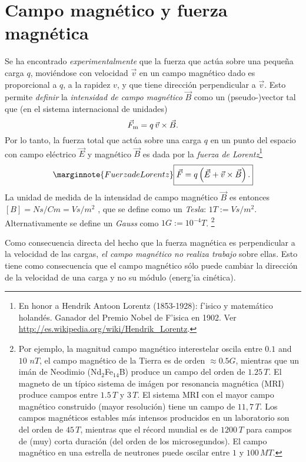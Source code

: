 \section{Campo magnético y fuerza magnética}
Se ha encontrado \textit{experimentalmente} que la fuerza que actúa sobre una peque\~na carga $q$, moviéndose con velocidad $\vec{v}$ en un campo magnético dado es proporcional a $q$, a la rapidez $v$, y que tiene dirección perpendicular a $\vec{v}$. Esto permite \textit{definir}  la \textit{intensidad de campo magnético} $\vec{B}$ como un (pseudo-)vector tal que (en el sistema internacional de unidades)
\begin{equation}
 \vec{F}_{\rm m}=q\,\vec{v}\times\vec{B}.
\end{equation}
Por lo tanto, la fuerza total que actúa sobre una carga $q$ en un punto del espacio con campo eléctrico $\vec{E}$ y magnético $\vec{B}$ es dada por la \textit{fuerza de Lorentz}\footnote{En honor a Hendrik Antoon Lorentz (1853-1928): f'isico y matemático holandés. Ganador del Premio Nobel de F'isica en 1902. Ver \url{http://es.wikipedia.org/wiki/Hendrik_Lorentz}.}
\begin{equation}\marginnote{Fuerza de Lorentz}
\boxed{ \vec{F}=q\left(\vec{E}+\vec{v}\times\vec{B}\right).}
\end{equation}
La unidad de medida de la intensidad de campo magnético $\vec{B}$ es entonces  $[B]=Ns/Cm=Vs/m^2$ , que se define como un \textit{Tesla}: $1T:=Vs/m^2$. Alternativamente se define un
\textit{Gauss} como $1G:=10^{-4}T$. \footnote{Por ejemplo, la magnitud campo
magnético interestelar oscila entre $0.1$ and $10$ $nT$, el campo magnético
de la Tierra es de orden $\approx 0.5 G$, mientras que un imán
de Neodimio (Nd${}_2$Fe${}_{14}$B) produce un campo del orden de $1.25\, T$.
El magneto de un típico sistema de imágen por resonancia magnética (MRI) produce campos entre $1.5\,T$ y $3\,T$. El sistema MRI con el mayor campo magnético construido (mayor resolución) tiene un campo de $11,7\,T$. Los campos magnéticos estables más intensos producidos en un laboratorio son del orden de $45\,T$, mientras que el récord mundial es de $1200\,T$ \cite{Brecord2018} para campos de (muy) corta duración (del orden de los microsegundos). El campo magnético en una estrella de neutrones puede oscilar entre $1$ y $100\, MT$.}

Como consecuencia directa del hecho que la fuerza magnética es perpendicular a
la velocidad de las cargas, \textit{el campo magnético no realiza trabajo} sobre ellas.
Esto tiene como consecuencia que el campo magnético sólo puede cambiar la
dirección de la velocidad de una carga y no su módulo (energ'ia cinética).

